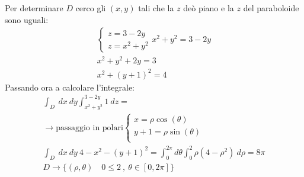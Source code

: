 \documentclass[a4paper, oneside]{article}
\begin{document}
Per determinare $D$ cerco gli $(x,y)$ tali che la $z$ deò piano e la $z$ del paraboloide sono uguali:
\begin{gather*}
  \begin{cases}
    z=3-2y\\
    z = x^2 + y^2
  \end{cases}
  x^2+y^2 = 3-2y\\
  x^2 + y^2 + 2y = 3\\
  x^2 + (y+1)^2 = 4
\end{gather*}
Passando ora a calcolare l'integrale:
\begin{gather*}
  \int_D \ dx \ dy \int_{x^2+y^2}^{3-2y} 1 \ dz = \\
  \rightarrow \text{passaggio in polari}\begin{cases}
    x = \rho \cos(\theta)\\
    y +1  = \rho \sin(\theta)\\
  \end{cases}\\
  \int_D \ dx \ dy \ 4-x^2-(y+1)^2 = \int_0^{2\pi} d\theta \int_0^2 \rho \left( 4 - \rho^2 \right) \ d\rho = 8\pi \\
  D \to \{(\rho , \theta) \quad 0 \leq 2 \ , \ \theta \in [0,2\pi] \}
\end{gather*}
\end{document}
